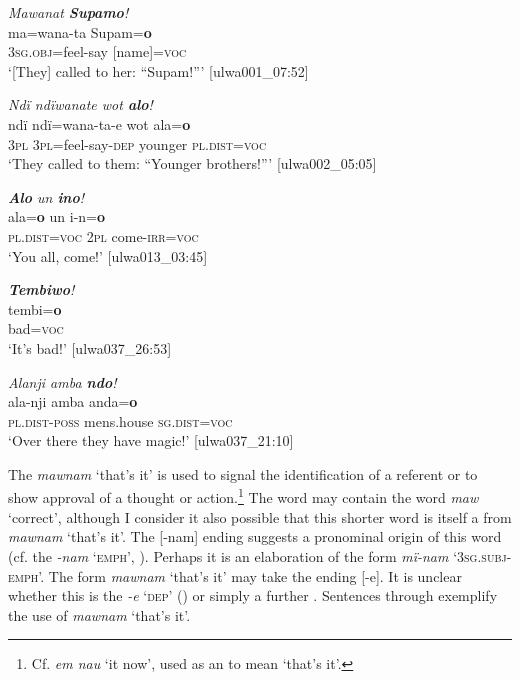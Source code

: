 \ea%
    \label{ex:otherwc:150}
          \textit{Mawanat \textbf{Supamo}!}\\
\gll    ma=wana-ta    Supam=\textbf{o}\\
    3\textsc{sg.obj}=feel-say  [name]=\textsc{voc}\\
\glt `[They] called to her: “Supam!”’ [ulwa001\_07:52]
\z

\ea%
    \label{ex:otherwc:151}
          \textit{Ndï ndïwanate wot \textbf{alo}!}\\
\gll    ndï  ndï=wana-ta-e    wot    ala{}=\textbf{o}\\
    \textsc{3pl}  3\textsc{pl}=feel-say-\textsc{dep}  younger  \textsc{pl.dist{}=voc}\\
\glt `They called to them: “Younger brothers!”’ [ulwa002\_05:05]
\z

\ea%
    \label{ex:otherwc:152}
          \textit{\textbf{Alo} un \textbf{ino}!}\\
\gll    ala{}=\textbf{o}      un  i-n=\textbf{o}\\
    \textsc{pl.dist{}=voc}  \textsc{2pl} come-\textsc{irr=voc}\\
\glt `You all, come!’ [ulwa013\_03:45]
\z

\ea%
    \label{ex:otherwc:153}
          \textit{\textbf{Tembiwo}!}\\
\gll    tembi=\textbf{o}\\
    bad=\textsc{voc}\\
\glt `It’s bad!’ [ulwa037\_26:53]
\z

\ea%
    \label{ex:otherwc:154}
          \textit{Alanji amba \textbf{ndo}!}\\
\gll    ala-nji      amba      anda{}=\textbf{o}\\
    \textsc{pl.dist{}-poss} mens.house  \textsc{sg.dist{}=voc}\\
\glt `Over there they have magic!’ [ulwa037\_21:10]
\z

The  \textit{mawnam} ‘that’s it’ is used to signal the  identification of a referent or to show approval of a thought or action.\footnote{Cf.  \textit{em nau} ‘it now’, used as an  to mean ‘that’s it’.} The word may contain the word \textit{maw} ‘correct’, although I consider it also possible that this shorter word is itself a  from \textit{mawnam} ‘that’s it’. The [-nam] ending suggests a pronominal origin of this word (cf. the   \textit{-nam} ‘\textsc{emph}’, ). Perhaps it is an elaboration of the form \textit{mï-nam} ‘3\textsc{sg.subj}-\textsc{emph}’. The form \textit{mawnam} ‘that’s it’ may take the ending [-e]. It is unclear whether this is the  \textit{-e} ‘\textsc{dep}’ () or simply a further  . Sentences  through  exemplify the use of \textit{mawnam} ‘that’s it’.

